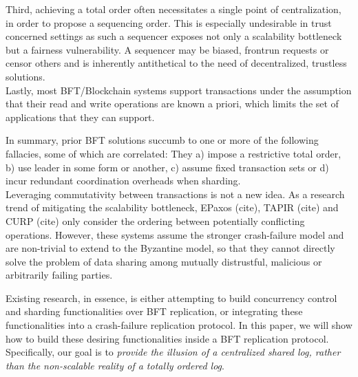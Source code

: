 Third, achieving a total order often  necessitates a single point of centralization, in order to propose a sequencing order. This is especially undesirable in trust concerned settings as such a sequencer exposes not only a scalability bottleneck but a fairness vulnerability. A sequencer may be biased, frontrun requests or censor others and is inherently antithetical to the need of decentralized, trustless solutions.\\

Lastly, most BFT/Blockchain systems support transactions under the assumption that their read and write operations are known a priori, which limits the set of applications that they can support. 


In summary, prior BFT solutions succumb to one or more of the following fallacies, some of which are correlated: They a) impose a restrictive total order, b) use leader in some form or another, c) assume fixed transaction sets or d) incur redundant coordination overheads when sharding. \\

Leveraging commutativity between transactions is not a new idea. As a research trend of mitigating the scalability bottleneck, EPaxos (cite), TAPIR (cite) and CURP (cite) only consider the ordering between potentially conflicting operations. However, these systems assume the stronger crash-failure model and are non-trivial to extend to the Byzantine model, so that they cannot directly solve the problem of data sharing among mutually distrustful, malicious or arbitrarily failing parties.
\fi

Existing research, in essence, is either attempting to build concurrency control and sharding functionalities over BFT replication, or integrating these functionalities into a crash-failure replication protocol. In this paper, we will show how to build these desiring functionalities inside a BFT replication protocol. Specifically, our goal is to \textit{provide the illusion of a centralized shared log, rather than the non-scalable reality of a totally ordered log}.\\

\iffalse
{}

